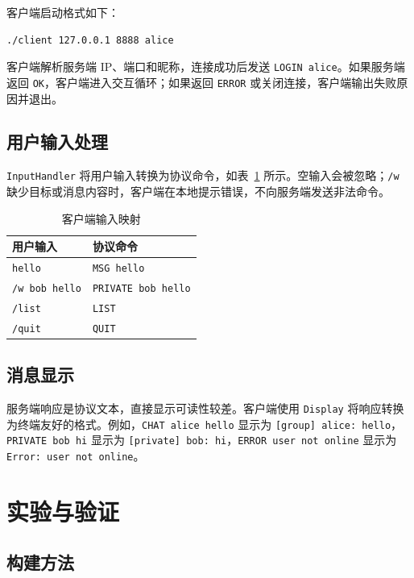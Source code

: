 \documentclass[UTF8,zihao=5,twocolumn]{ctexart}
\newcommand{\code}[1]{\texttt{#1}}
\begin{document}
客户端启动格式如下：

\begin{lstlisting}[style=textstyle,caption={客户端启动命令}]
./client 127.0.0.1 8888 alice
\end{lstlisting}

客户端解析服务端 IP、端口和昵称，连接成功后发送 \code{LOGIN alice}。如果服务端返回 \code{OK}，客户端进入交互循环；如果返回 \code{ERROR} 或关闭连接，客户端输出失败原因并退出。

\subsection{用户输入处理}

\code{InputHandler} 将用户输入转换为协议命令，如表~\ref{tab:client-command} 所示。空输入会被忽略；\code{/w} 缺少目标或消息内容时，客户端在本地提示错误，不向服务端发送非法命令。

\begin{table}[ht]
\centering
\caption{客户端输入映射}
\label{tab:client-command}
\small
\begin{tabular}{ll}
\toprule
用户输入 & 协议命令 \\
\midrule
\code{hello} & \code{MSG hello} \\
\code{/w bob hello} & \code{PRIVATE bob hello} \\
\code{/list} & \code{LIST} \\
\code{/quit} & \code{QUIT} \\
\bottomrule
\end{tabular}
\end{table}

\subsection{消息显示}

服务端响应是协议文本，直接显示可读性较差。客户端使用 \code{Display} 将响应转换为终端友好的格式。例如，\code{CHAT alice hello} 显示为 \code{[group] alice: hello}，\code{PRIVATE bob hi} 显示为 \code{[private] bob: hi}，\code{ERROR user not online} 显示为 \code{Error: user not online}。

\section{实验与验证}

\subsection{构建方法}
\end{document}

